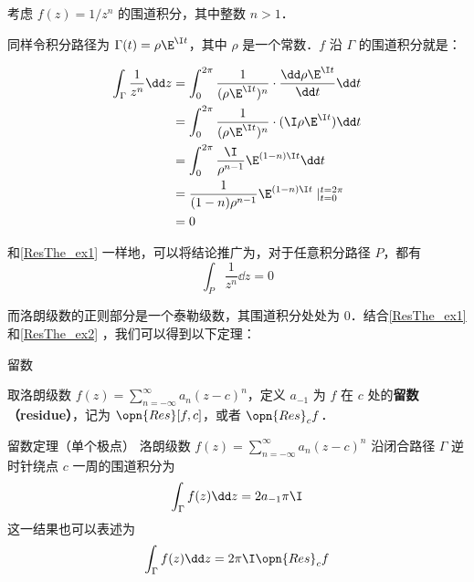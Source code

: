 \begin{example}{}\label{ResThe_ex2}
考虑 $f(z)=1/z^n$ 的围道积分，其中整数 $n>1$．

同样令积分路径为 $\Gamma(t)=\rho\E^{\I t}$，其中 $\rho$ 是一个常数．$f$ 沿 $\Gamma$ 的围道积分就是：

\begin{equation}
\begin{aligned}
\int_{\Gamma}\frac{1}{z^n}\dd z&=\int^{2\pi}_0\frac{1}{(\rho\E^{\I t})^n}\cdot\frac{\dd\rho\E^{\I t}}{\dd t}\dd t\\
&=\int_0^{2\pi}\frac{1}{(\rho\E^{\I t})^n}\cdot (\I \rho \E^{\I t})\dd t\\
&=\int_0^{2\pi}\frac{\I}{\rho^{n-1}}\E^{(1-n)\I t}\dd t\\
&=\frac{1}{(1-n)\rho^{n-1}}\E^{(1-n)\I t}\mid^{t=2\pi}_{t=0}\\
&=0
\end{aligned}
\end{equation}

和\autoref{ResThe_ex1} 一样地，可以将结论推广为，对于任意积分路径 $P$，都有
\begin{equation}
\int_P\frac{1}{z^n}\dd z=0
\end{equation}

\end{example}

而洛朗级数的正则部分是一个泰勒级数，其围道积分处处为 $0$．结合\autoref{ResThe_ex1} 和\autoref{ResThe_ex2} ，我们可以得到以下定理：

\begin{definition}{留数}

取洛朗级数 $f(z)=\sum\limits_{n=-\infty}^{\infty} a_n(z-c)^n$，定义 $a_{-1}$ 为 $f$ 在 $c$ 处的\textbf{留数（residue）}，记为 $\opn{Res}[f, c]$，或者 $\opn{Res}_cf$．

\end{definition}

\begin{theorem}{留数定理（单个极点）}\label{ResThe_the1}
洛朗级数 $f(z)=\sum\limits_{n=-\infty}^{\infty} a_n(z-c)^n$ 沿闭合路径 $\Gamma$ 逆时针绕点 $c$ 一周的围道积分为
\begin{equation}
\int_\Gamma f(z)\dd z=2a_{-1}\pi\I
\end{equation}
这一结果也可以表述为
\begin{equation}
\int_\Gamma f(z)\dd z=2\pi\I\opn{Res}_cf
\end{equation}

\end{theorem}

